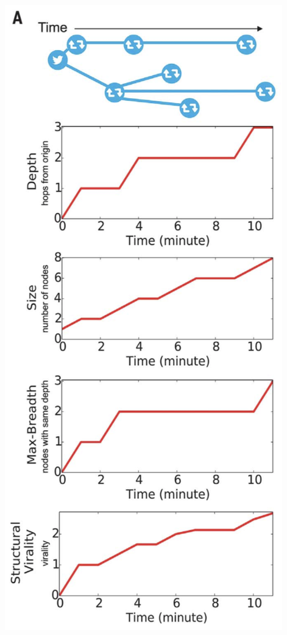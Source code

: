 \documentclass[aspectratio=169]{beamer}
\begin{document}
\begin{frame} 

\begin{center}
\includegraphics[height=0.9\textheight]{figures/vosoughi_spread_2018_fig1a}
\end{center}

\end{frame}
\end{document}
